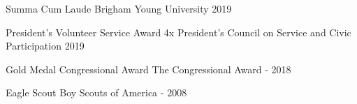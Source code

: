 
\begin{cvhonors}
    
  \cvhonor
    {Summa Cum Laude} %
    {Brigham Young University} %
    {} %
    {2019} %
    
  \cvhonor
    {President's Volunteer Service Award 4x} %
    {President's Council on Service and Civic Participation} %
    {} %
    {2019} %


  \cvhonor
    {Gold Medal Congressional Award} %
    {The Congressional Award} %
    {-} %
    {2018} %
    
  \cvhonor
    {Eagle Scout} %
    {Boy Scouts of America} %
    {-} %
    {2008} %



\end{cvhonors}

